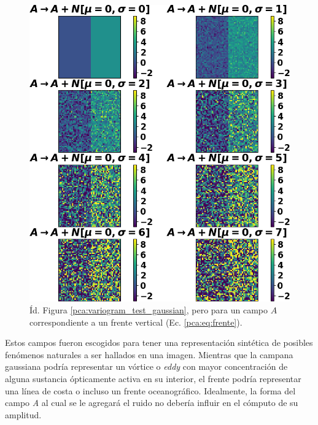             \begin{figure}
            \centering
            \includegraphics[width=\textwidth]{pca/figures/variogram_test_front.png}
            \caption[Conjunto de imágenes sintéticas a diferentes niveles de ruido (campo: frente vertical).]{Íd. Figura \ref{pca:variogram_test_gaussian}, pero para un campo $A$ correspondiente a un frente vertical (Ec. \ref{pca:eq:frente}).}
            \label{pca:variogram_test_front}
            \end{figure}

            Estos campos fueron escogidos para tener una representación sintética de posibles fenómenos naturales a ser hallados en una imagen. Mientras que la campana gaussiana podría representar un vórtice o \textit{eddy} con mayor concentración de alguna sustancia ópticamente activa en su interior, el frente podría representar una línea de costa o incluso un frente oceanográfico. Idealmente, la forma del campo \textit{A} al cual se le agregará el ruido no debería influir en el cómputo de su amplitud.
            
